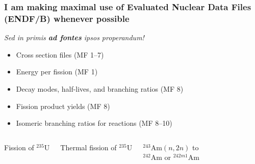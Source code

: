 \documentclass[compress,10pt]{beamer}
\begin{document}
\begin{frame}
    \frametitle{I am making maximal use of Evaluated Nuclear Data Files (ENDF/B) whenever possible}

    \begin{block}{\textit{Sed in primis \textbf{ad fontes} ipsos properandum!}\footnotemark}
        \begin{itemize}
        \item Cross section files (MF 1--7)
        \item Energy per fission (MF 1)
        \item Decay modes, half-lives, and branching ratios (MF 8)
        \item Fission product yields (MF 8)
        \item Isomeric branching ratios for reactions (MF 8--10)
        \end{itemize}
    \end{block}

    \centering
    \begin{columns}[b]


        \centering

        {\footnotesize Fission of $^{235}$U  } \\


        \centering

        {\footnotesize Thermal fission of $^{235}$U  } \\


        \centering

        {\footnotesize $^{243}\text{Am} (n,2n)$ to \\$^{242}\text{Am}$ or $^{242m1}\text{Am}$  } \\

    \end{columns}

    \centering
    \begin{columns}[c]



\end{columns}
\end{frame}
\end{document}
